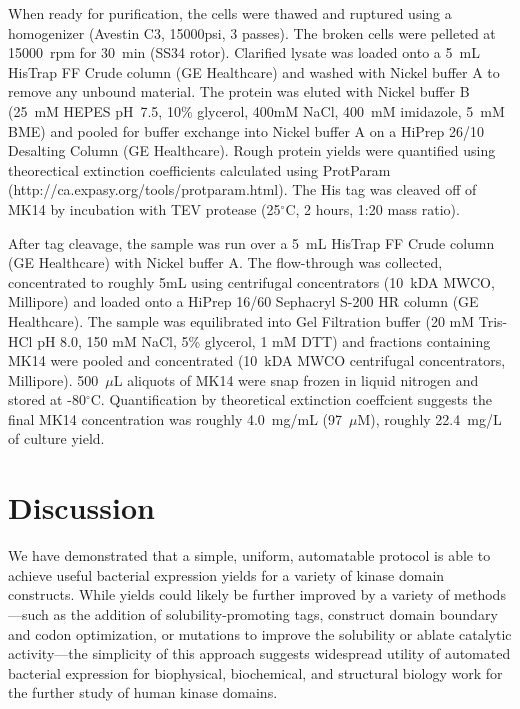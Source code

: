 \documentclass[phd,tocprelim]{cornell}
\begin{document}
When ready for purification, the cells were thawed and ruptured using a homogenizer (Avestin C3, 15000psi, 3 passes). The broken cells were pelleted at 15000~rpm for 30~min (SS34 rotor). Clarified lysate was loaded onto a  5~mL HisTrap FF Crude column (GE Healthcare) and washed with Nickel buffer A to remove any unbound material. The protein was eluted with Nickel buffer B (25~mM HEPES pH~7.5, 10\% glycerol, 400mM NaCl, 400~mM imidazole, 5~mM BME) and pooled for buffer exchange into Nickel buffer A on a HiPrep 26/10 Desalting Column (GE Healthcare). Rough protein yields were quantified using theorectical extinction coefficients calculated using ProtParam (http://ca.expasy.org/tools/protparam.html). The His tag was cleaved off of MK14 by incubation with TEV protease (25$^{\circ}$C, 2 hours, 1:20 mass ratio). 

After tag cleavage, the sample was run over a 5~mL HisTrap FF Crude column (GE Healthcare) with Nickel buffer A. 
The flow-through was collected, concentrated to roughly 5mL using centrifugal concentrators (10~kDA MWCO, Millipore) and loaded onto a HiPrep 16/60 Sephacryl S-200 HR column (GE Healthcare). 
The sample was equilibrated into Gel Filtration buffer (20 mM Tris-HCl pH 8.0, 150 mM NaCl, 5\% glycerol, 1 mM DTT) and fractions containing MK14 were pooled and concentrated (10~kDA MWCO centrifugal concentrators, Millipore). 
500~$\mu$L aliquots of MK14 were snap frozen in liquid nitrogen and stored at -80$^{\circ}$C. Quantification by theoretical extinction coeffcient suggests the final MK14 concentration was roughly 4.0~mg/mL (97~$\mu$M), roughly 22.4~mg/L of culture yield.  

\section{Discussion}
\label{section:discussion}

We have demonstrated that a simple, uniform, automatable protocol is able to achieve useful bacterial expression yields for a variety of kinase domain constructs.
While yields could likely be further improved by a variety of methods---such as the addition of solubility-promoting tags, construct domain boundary and codon optimization, or mutations to improve the solubility or ablate catalytic activity---the simplicity of this approach suggests widespread utility of automated bacterial expression for biophysical, biochemical, and structural biology work for the further study of human kinase domains.
\end{document}
